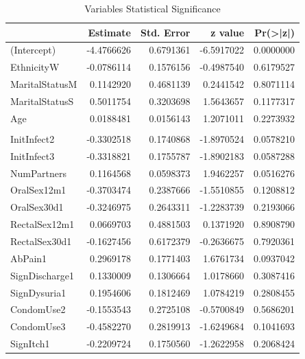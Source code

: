 \documentclass[
]{article}
\begin{document}
\begin{table}

\caption{\label{tab:variable-select}Variables Statistical Significance}
\centering
\begin{tabular}[t]{l|r|r|r|r}
\hline
  & Estimate & Std. Error & z value & Pr(>|z|)\\
\hline
(Intercept) & -4.4766626 & 0.6791361 & -6.5917022 & 0.0000000\\
\hline
EthnicityW & -0.0786114 & 0.1576156 & -0.4987540 & 0.6179527\\
\hline
MaritalStatusM & 0.1142920 & 0.4681139 & 0.2441542 & 0.8071114\\
\hline
MaritalStatusS & 0.5011754 & 0.3203698 & 1.5643657 & 0.1177317\\
\hline
Age & 0.0188481 & 0.0156143 & 1.2071011 & 0.2273932\\
\hline
\cellcolor{blue}{\textcolor{white}{YearsSchool}} & \cellcolor{blue}{\textcolor{white}{-0.1689015}} & \cellcolor{blue}{\textcolor{white}{0.0442657}} & \cellcolor{blue}{\textcolor{white}{-3.8156308}} & \cellcolor{blue}{\textcolor{white}{0.0001358}}\\
\hline
InitInfect2 & -0.3302518 & 0.1740868 & -1.8970524 & 0.0578210\\
\hline
InitInfect3 & -0.3318821 & 0.1755787 & -1.8902183 & 0.0587288\\
\hline
NumPartners & 0.1164568 & 0.0598373 & 1.9462257 & 0.0516276\\
\hline
OralSex12m1 & -0.3703474 & 0.2387666 & -1.5510855 & 0.1208812\\
\hline
OralSex30d1 & -0.3246975 & 0.2643311 & -1.2283739 & 0.2193066\\
\hline
RectalSex12m1 & 0.0669703 & 0.4881503 & 0.1371920 & 0.8908790\\
\hline
RectalSex30d1 & -0.1627456 & 0.6172379 & -0.2636675 & 0.7920361\\
\hline
AbPain1 & 0.2969178 & 0.1771403 & 1.6761734 & 0.0937042\\
\hline
SignDischarge1 & 0.1330009 & 0.1306664 & 1.0178660 & 0.3087416\\
\hline
SignDysuria1 & 0.1954606 & 0.1812469 & 1.0784219 & 0.2808455\\
\hline
CondomUse2 & -0.1553543 & 0.2725108 & -0.5700849 & 0.5686201\\
\hline
CondomUse3 & -0.4582270 & 0.2819913 & -1.6249684 & 0.1041693\\
\hline
SignItch1 & -0.2209724 & 0.1750560 & -1.2622958 & 0.2068424\\

\end{tabular}
\end{table}
\end{document}
